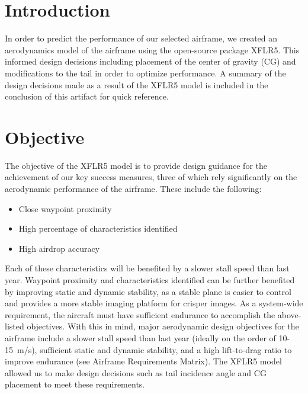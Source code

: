 \documentclass[]{auvsi_doc}
\begin{document}
\begin{AUVSITitlePage}
\begin{artifacttable}
\end{artifacttable}
\end{AUVSITitlePage}

\section{Introduction}
In order to predict the performance of our selected airframe, we created an aerodynamics model of the airframe using the open-source package XFLR5. This informed design decisions including placement of the center of gravity (CG) and modifications to the tail in order to optimize performance. A summary of the design decisions made as a result of the XFLR5 model is included in the conclusion of this artifact for quick reference.

\section{Objective}
The objective of the XFLR5 model is to provide design guidance for the achievement of our key success measures, three of which rely significantly on the aerodynamic performance of the airframe. These include the following:
\begin{itemize}
	\item Close waypoint proximity
	\item High percentage of characteristics identified
	\item High airdrop accuracy
\end{itemize}
Each of these characteristics will be benefited by a slower stall speed than last year. Waypoint proximity and characteristics identified can be further benefited by improving static and dynamic stability, as a stable plane is easier to control and provides a more stable imaging platform for crisper images. As a system-wide requirement, the aircraft must have sufficient endurance to accomplish the above-listed objectives. With this in mind, major aerodynamic design objectives for the airframe include a slower stall speed than last year (ideally on the order of 10-15~m/s), sufficient static and dynamic stability, and a high lift-to-drag ratio to improve endurance (see Airframe Requirements Matrix). The XFLR5 model allowed us to make design decisions such as tail incidence angle and CG placement to meet these requirements.
\end{document}
